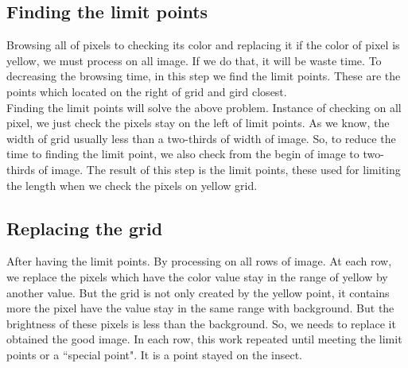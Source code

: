 \subsection{Finding the limit points}
Browsing all of pixels to checking its color and replacing it if the color of pixel is yellow, we must process on all image. If we do that, it will be waste time. To decreasing the browsing time, in this step we find the limit points. These are the points which located on the right of grid and gird closest.\\
Finding the limit points will solve the above problem. Instance of checking on all pixel, we just check the pixels stay on the left of limit points. As we know, the width of grid usually less than a two-thirds of width of image. So, to reduce the time to finding the limit point, we also check from the begin of image to two-thirds of image. The result of this step is the limit points, these used for limiting the length when we check the pixels on yellow grid.
\subsection{Replacing the grid}
After having the limit points. By processing on all rows of image. At each row, we replace the pixels which have the color value stay in the range of yellow by another value. But the grid is not only created by the yellow point, it contains more the pixel have the value stay in the same range with background. But the brightness of these pixels is less than the background. So, we needs to replace it obtained the good image. In each row, this work repeated until meeting the limit points or a ``special point". It is a point stayed on the insect.
